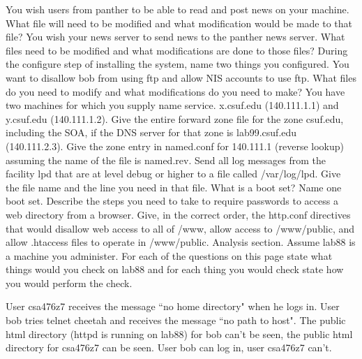 You wish users from {\ltt{}panther} to be able to read and
post news on your machine.
What file will need to be modified
and what modification would be made to that file?
\vskip 2.4in
\ques
You wish your news server to send news to the
{\ltt{}panther} news server.
What files need to be modified and what modifications are done to those files?
\vskip 2.2in
\vfill\eject
\ques
During the configure step of installing the system, name two things you
configured.
\vskip 0.7in
\ques
You want to disallow {\ltt{}bob} from using ftp and
allow NIS accounts to use ftp.
What files do you need to modify and what modifications do you need to make?
\vskip 1.4in
\ques
You have two machines for which you supply name service.
{\ltt{}x.csuf.edu} ({\ltt{}140.111.1.1}) and 
{\ltt{}y.csuf.edu} ({\ltt{}140.111.1.2}).
Give the entire forward zone file for the zone {\ltt{}csuf.edu},
including the SOA, if the DNS server for that zone
is {\ltt{}lab99.csuf.edu} ({\ltt{}140.111.2.3}).
\vskip 4.2in
\ques
Give the zone entry in {\ltt{}named.conf}
for {\ltt{}140.111.1} (reverse lookup) assuming
the name of the file is {\ltt{}named.rev}.
\vfill\eject
\ques
Send all log messages from the 
facility {\ltt{}lpd} that are at level {\ltt{}debug} or higher
to a file called {\ltt{}/var/log/lpd}.
Give the file name and the line you need in that file.
\vskip 0.8in
\ques
What is a boot set?
Name one boot set.
\vskip 1.2in
\ques
Describe the steps you need to take to require passwords to access
a web directory from a browser.
\vskip 1.9in
\ques
Give, in the correct order, the {\ltt{}http.conf} directives that would
disallow web access to all of {\ltt{}/www}, allow access to {\ltt{}/www/public},
and allow {\ltt{}.htaccess} files to operate in {\ltt{}/www/public}.
\vskip 2.3in
\vfill\eject
Analysis section. Assume {\ltt{}lab88} is a machine you administer.
For each of the questions on this page
state what things would you check on {\ltt{}lab88}
and for each thing you would check state how you would perform the check.

\ques
User {\ltt{}csa476z7} receives the message ``no home directory"
when he logs in.
\vfill
\ques
User {\ltt{}bob} tries {\ltt{}telnet cheetah} and receives the
message ``no path to host".
\vfill
\ques
The public html directory ({\ltt{}httpd} is running on {\ltt{}lab88}) for
{\ltt{}bob} can't be seen, the public html directory for {\ltt{}csa476z7}
can be seen.
\vfill
\ques
User {\ltt{}bob} can log in, user {\ltt{}csa476z7} can't.
\bye

